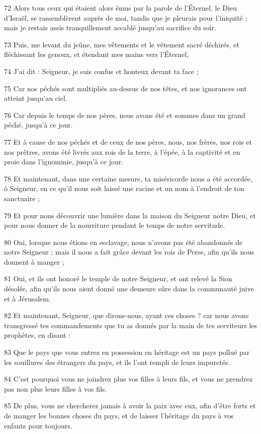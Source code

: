 \par 72 Alors tous ceux qui étaient alors émus par la parole de l'Éternel, le Dieu d'Israël, se rassemblèrent auprès de moi, tandis que je pleurais pour l'iniquité ; mais je restais assis tranquillement accablé jusqu'au sacrifice du soir.
\par 73 Puis, me levant du jeûne, mes vêtements et le vêtement sacré déchirés, et fléchissant les genoux, et étendant mes mains vers l'Éternel,
\par 74 J'ai dit : Seigneur, je suis confus et honteux devant ta face ;
\par 75 Car nos péchés sont multipliés au-dessus de nos têtes, et nos ignorances ont atteint jusqu'au ciel.
\par 76 Car depuis le temps de nos pères, nous avons été et sommes dans un grand péché, jusqu'à ce jour.
\par 77 Et à cause de nos péchés et de ceux de nos pères, nous, nos frères, nos rois et nos prêtres, avons été livrés aux rois de la terre, à l'épée, à la captivité et en proie dans l'ignominie, jusqu'à ce jour.
\par 78 Et maintenant, dans une certaine mesure, ta miséricorde nous a été accordée, ô Seigneur, en ce qu'il nous soit laissé une racine et un nom à l'endroit de ton sanctuaire ;
\par 79 Et pour nous découvrir une lumière dans la maison du Seigneur notre Dieu, et pour nous donner de la nourriture pendant le temps de notre servitude.
\par 80 Oui, lorsque nous étions en esclavage, nous n'avons pas été abandonnés de notre Seigneur ; mais il nous a fait grâce devant les rois de Perse, afin qu'ils nous donnent à manger ;
\par 81 Oui, et ils ont honoré le temple de notre Seigneur, et ont relevé la Sion désolée, afin qu'ils nous aient donné une demeure sûre dans la communauté juive et à Jérusalem.
\par 82 Et maintenant, Seigneur, que dirons-nous, ayant ces choses ? car nous avons transgressé tes commandements que tu as donnés par la main de tes serviteurs les prophètes, en disant :
\par 83 Que le pays que vous entrez en possession en héritage est un pays pollué par les souillures des étrangers du pays, et ils l'ont rempli de leurs impuretés.
\par 84 C'est pourquoi vous ne joindrez plus vos filles à leurs fils, et vous ne prendrez pas non plus leurs filles à vos fils.
\par 85 De plus, vous ne chercherez jamais à avoir la paix avec eux, afin d'être forts et de manger les bonnes choses du pays, et de laisser l'héritage du pays à vos enfants pour toujours.
